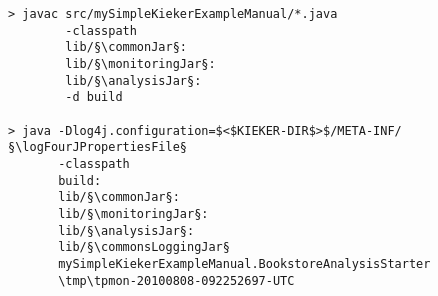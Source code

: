 \begin{lstlisting}[caption=Compile and run under Linux] 			
> javac src/mySimpleKiekerExampleManual/*.java
        -classpath	
        lib/§\commonJar§:
        lib/§\monitoringJar§:
        lib/§\analysisJar§:
        -d build

> java -Dlog4j.configuration=$<$KIEKER-DIR$>$/META-INF/§\logFourJPropertiesFile§
       -classpath
       build:
       lib/§\commonJar§:
       lib/§\monitoringJar§:
       lib/§\analysisJar§:
       lib/§\commonsLoggingJar§
       mySimpleKiekerExampleManual.BookstoreAnalysisStarter 
       \tmp\tpmon-20100808-092252697-UTC
\end{lstlisting}	
